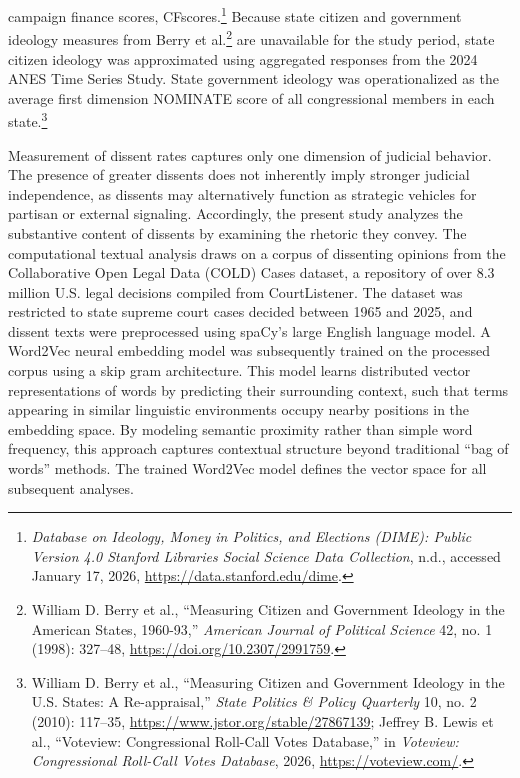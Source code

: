 campaign finance scores, CFscores.\footnote{\emph{Database on
  {Ideology}, {Money} in {Politics}, and {Elections} ({DIME}): {Public}
  Version 4.0 \textbar{} {Stanford Libraries Social Science Data
  Collection}}, n.d., accessed January 17, 2026,
  \url{https://data.stanford.edu/dime}.} Because state citizen and
government ideology measures from Berry et al.\footnote{William D. Berry
  et al., {``Measuring {Citizen} and {Government Ideology} in the
  {American States}, 1960-93,''} \emph{American Journal of Political
  Science} 42, no. 1 (1998): 327--48,
  \url{https://doi.org/10.2307/2991759}.} are unavailable for the study
period, state citizen ideology was approximated using aggregated
responses from the 2024 ANES Time Series Study. State government
ideology was operationalized as the average first dimension NOMINATE
score of all congressional members in each state.\footnote{William D.
  Berry et al., {``Measuring {Citizen} and {Government Ideology} in the
  {U}.{S}. {States}: {A Re-appraisal},''} \emph{State Politics \& Policy
  Quarterly} 10, no. 2 (2010): 117--35,
  \url{https://www.jstor.org/stable/27867139}; Jeffrey B. Lewis et al.,
  {``Voteview: {Congressional Roll-Call Votes Database},''} in
  \emph{Voteview: Congressional Roll-Call Votes Database}, 2026,
  \url{https://voteview.com/}.}

Measurement of dissent rates captures only one dimension of judicial
behavior. The presence of greater dissents does not inherently imply
stronger judicial independence, as dissents may alternatively function
as strategic vehicles for partisan or external signaling. Accordingly,
the present study analyzes the substantive content of dissents by
examining the rhetoric they convey. The computational textual analysis
draws on a corpus of dissenting opinions from the Collaborative Open
Legal Data (COLD) Cases dataset, a repository of over 8.3 million U.S.
legal decisions compiled from CourtListener. The dataset was restricted
to state supreme court cases decided between 1965 and 2025, and dissent
texts were preprocessed using spaCy's large English language model. A
Word2Vec neural embedding model was subsequently trained on the
processed corpus using a skip gram architecture. This model learns
distributed vector representations of words by predicting their
surrounding context, such that terms appearing in similar linguistic
environments occupy nearby positions in the embedding space. By modeling
semantic proximity rather than simple word frequency, this approach
captures contextual structure beyond traditional ``bag of words''
methods. The trained Word2Vec model defines the vector space for all
subsequent analyses.

